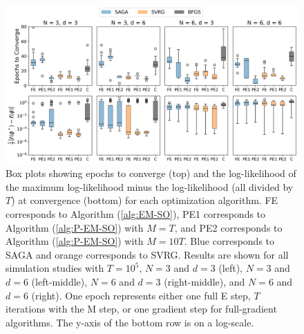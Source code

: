 %
\begin{figure}
    \centering
    \includegraphics[width=6.5in]{../plt/boxplots_sim_T_100000.png}
    \caption{Box plots showing epochs to converge (top) and the log-likelihood of the maximum log-likelihood minus the log-likelihood (all divided by $T$) at convergence (bottom) for each optimization algorithm. FE corresponds to Algorithm (\ref{alg:EM-SO}), PE1 corresponds to Algorithm (\ref{alg:P-EM-SO}) with $M=T$, and PE2 corresponds to Algorithm (\ref{alg:P-EM-SO}) with $M=10T$. Blue corresponds to SAGA and orange corresponds to SVRG. Results are shown for all simulation studies with $T=10^{5}$, $N=3$ and $d=3$ (left), $N=3$ and $d=6$ (left-middle), $N=6$ and $d=3$ (right-middle), and $N=6$ and $d=6$ (right). One epoch represents either one full E step, $T$ iterations with the M step, or one gradient step for full-gradient algorithms. The y-axis of the bottom row is on a log-scale.}
    \label{fig:boxplots_sim}
\end{figure}
%
